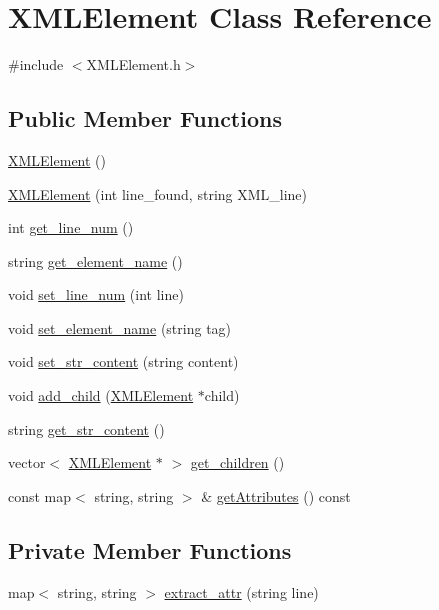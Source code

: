 \hypertarget{class_x_m_l_element}{}\section{X\+M\+L\+Element Class Reference}
\label{class_x_m_l_element}


{\ttfamily \#include $<$X\+M\+L\+Element.\+h$>$}

\subsection*{Public Member Functions}
\begin{DoxyCompactItemize}
\item 
\hyperlink{class_x_m_l_element_ae6e0c3440c60484c1fa97e06efdae280}{X\+M\+L\+Element} ()
\item 
\hyperlink{class_x_m_l_element_af9a5086b0eb8e32633d454169d2530ef}{X\+M\+L\+Element} (int line\+\_\+found, string X\+M\+L\+\_\+line)
\item 
int \hyperlink{class_x_m_l_element_ad7c45aa65275ff66bd3295bce8c409a1}{get\+\_\+line\+\_\+num} ()
\item 
string \hyperlink{class_x_m_l_element_afa2abd65f1413992f1a9523a088ebecf}{get\+\_\+element\+\_\+name} ()
\item 
void \hyperlink{class_x_m_l_element_a7d61b29503d9fcb1170aede0d1f8fc6f}{set\+\_\+line\+\_\+num} (int line)
\item 
void \hyperlink{class_x_m_l_element_afe078c3f6f8ac606add305b9196a8930}{set\+\_\+element\+\_\+name} (string tag)
\item 
void \hyperlink{class_x_m_l_element_a865f7f8976d3bbe0820dee4f52f9abfe}{set\+\_\+str\+\_\+content} (string content)
\item 
void \hyperlink{class_x_m_l_element_a95b917dfc225ddc5dc81444356d65868}{add\+\_\+child} (\hyperlink{class_x_m_l_element}{X\+M\+L\+Element} $\ast$child)
\item 
string \hyperlink{class_x_m_l_element_a34318d5eca211d29f1bb04f76d9386c6}{get\+\_\+str\+\_\+content} ()
\item 
vector$<$ \hyperlink{class_x_m_l_element}{X\+M\+L\+Element} $\ast$ $>$ \hyperlink{class_x_m_l_element_aeeb4a986c6e25126b0cc74c83ea39be7}{get\+\_\+children} ()
\item 
const map$<$ string, string $>$ \& \hyperlink{class_x_m_l_element_a88d57f7c16383a120e659c101daf147b}{get\+Attributes} () const 
\end{DoxyCompactItemize}
\subsection*{Private Member Functions}
\begin{DoxyCompactItemize}
\item 
map$<$ string, string $>$ \hyperlink{class_x_m_l_element_aa54b802214293181a7ed65bba1c585a5}{extract\+\_\+attr} (string line)
\end{DoxyCompactItemize}

